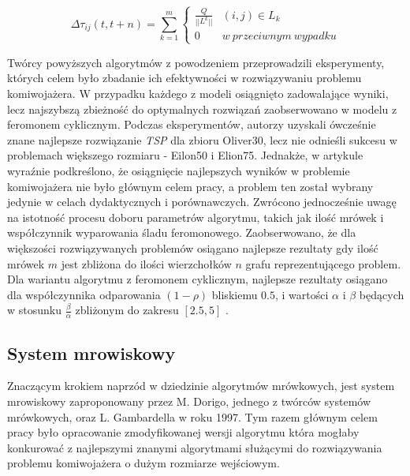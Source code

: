 {{{            \begin{equation}\label{eqt:pheromone-cycle}
                \Delta\tau_{ij}(t, t + n) = \sum_{k=1}^m \left\{
                        \begin{matrix}
                            \frac{Q}{||L^k||} & (i, j) \in L_k\\
                            0 & w\ przeciwnym\ wypadku
                        \end{matrix}
                    \right.
            \end{equation}

            Twórcy powyższych algorytmów z powodzeniem przeprowadzili eksperymenty, których celem było zbadanie ich
            efektywności w rozwiązywaniu problemu komiwojażera. W przypadku każdego z modeli osiągnięto zadowalające
            wyniki, lecz najszybszą zbieżność do optymalnych rozwiązań zaobserwowano w modelu z feromonem cyklicznym.
            Podczas eksperymentów, autorzy uzyskali ówcześnie znane najlepsze rozwiązanie \textit{TSP} dla zbioru
            Oliver30, lecz nie odnieśli sukcesu w problemach większego rozmiaru - Eilon50 i Elion75. Jednakże, w
            artykule wyraźnie podkreślono, że osiągnięcie najlepszych wyników w problemie komiwojażera nie było głównym
            celem pracy, a problem ten został wybrany jedynie w celach dydaktycznych i porównawczych. Zwrócono
            jednocześnie uwagę na istotność procesu doboru parametrów algorytmu, takich jak ilość mrówek i współczynnik
            wyparowania śladu feromonowego. Zaobserwowano, że dla większości rozwiązywanych problemów osiągano najlepsze
            rezultaty gdy ilość mrówek $m$ jest zbliżona do ilości wierzchołków $n$ grafu reprezentującego problem. Dla
            wariantu algorytmu z feromonem cyklicznym, najlepsze rezultaty osiągano dla współczynnika odparowania $(1 -
            \rho)$ bliskiemu $0.5$, i wartości $\alpha$ i $\beta$ będących w stosunku $\frac{\beta}{\alpha}$ zbliżonym
            do zakresu $[2.5, 5]$ \cite{Dorigo1991AntSA}.
        }

        \subsection{System mrowiskowy}
        {
            Znaczącym krokiem naprzód w dziedzinie algorytmów mrówkowych, jest system mrowiskowy zaproponowany przez M.
            Dorigo, jednego z twórców systemów mrówkowych, oraz L. Gambardella w roku 1997\cite{Dorigo1997AntCS}. Tym
            razem głównym celem pracy było opracowanie zmodyfikowanej wersji algorytmu która mogłaby konkurować z
            najlepszymi znanymi algorytmami służącymi do rozwiązywania problemu komiwojażera o dużym rozmiarze
            wejściowym.

}}}
